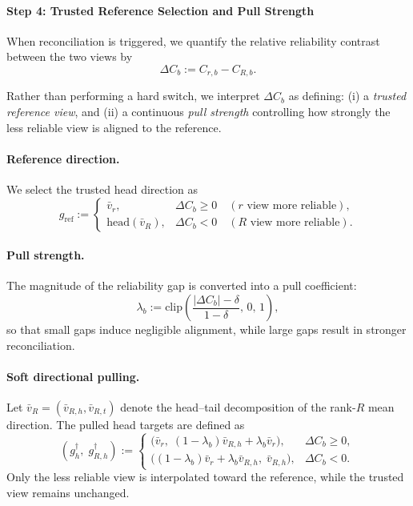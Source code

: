 \documentclass{article}
\begin{document}
\paragraph{Step 4: Trusted Reference Selection and Pull Strength}
When reconciliation is triggered, we quantify the relative reliability
contrast between the two views by
\[
\Delta C_b := C_{r,b} - C_{R,b}.
\]

Rather than performing a hard switch, we interpret $\Delta C_b$ as defining:
(i) a \emph{trusted reference view}, and
(ii) a continuous \emph{pull strength} controlling how strongly the less
reliable view is aligned to the reference.

\paragraph{Reference direction.}
We select the trusted head direction as
\[
g_{\mathrm{ref}} :=
\begin{cases}
\bar v_r, & \Delta C_b \ge 0 \quad (\text{$r$ view more reliable}), \\
\mathrm{head}(\bar v_R), & \Delta C_b < 0 \quad (\text{$R$ view more reliable}).
\end{cases}
\]

\paragraph{Pull strength.}
The magnitude of the reliability gap is converted into a pull coefficient:
\[
\lambda_b := \mathrm{clip}\!\left(\frac{|\Delta C_b|-\delta}{1-\delta},\,0,\,1\right),
\]
so that small gaps induce negligible alignment,
while large gaps result in stronger reconciliation.

\paragraph{Soft directional pulling.}
Let $\bar v_R=(\bar v_{R,h},\bar v_{R,t})$ denote the head--tail decomposition
of the rank-$R$ mean direction.
The pulled head targets are defined as
\[
(g_h^\dagger,\; g_{R,h}^\dagger) :=
\begin{cases}
\big(\bar v_r,\; (1-\lambda_b)\bar v_{R,h} + \lambda_b \bar v_r\big), & \Delta C_b \ge 0, \\[6pt]
\big((1-\lambda_b)\bar v_r + \lambda_b \bar v_{R,h},\; \bar v_{R,h}\big), & \Delta C_b < 0.
\end{cases}
\]
Only the less reliable view is interpolated toward the reference,
while the trusted view remains unchanged.
\end{document}
